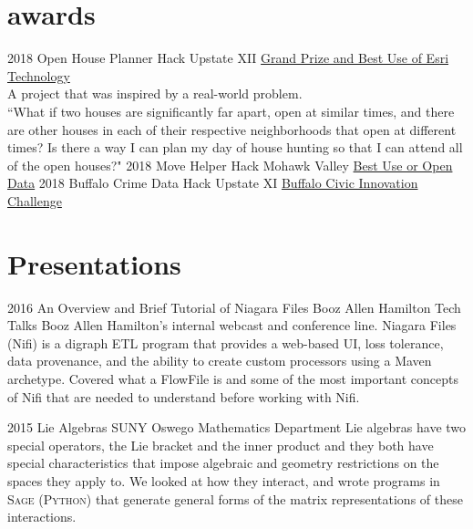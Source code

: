 \documentclass[]{twentysecondcv}
\begin{document}
\section{awards}
  \begin{twenty}
    \twentyitem
    {2018}
    {Open House Planner} %
    {Hack Upstate XII} %
    {\href{https://medium.com/@hackupstate/hack-upstate-xii-the-results-are-in-e5be2f4edcc0}{Grand Prize and Best Use of Esri Technology}\\
    A project that was inspired by a real-world problem.\\
    ``What if two houses are significantly far apart, open at similar times, and there are other houses in each of their respective neighborhoods that open at different times? Is there a way I can plan my day of house hunting so that I can attend all of the open houses?"} %
    \twentyitem
      {2018}
      {Move Helper} %
      {Hack Mohawk Valley} %
      {\href{https://medium.com/@hackupstate/hack-mohawk-valley-the-results-are-in-4dff78924a61\#9a90}{Best Use or Open Data}} %
    \twentyitem
    {2018}
      {Buffalo Crime Data} %
      {Hack Upstate XI} %
      {\href{https://medium.com/@hackupstate/hack-upstate-xi-the-results-are-in-5ee7973f25a\#ffa5}{Buffalo Civic Innovation Challenge}\\
      } %
  \end{twenty}

\newpage
\makeprofile
\section{Presentations}
\begin{twenty}
  \twentyitem
  {2016}
  {An Overview and Brief Tutorial of Niagara Files}
  {Booz Allen Hamilton Tech Talks} %
  {Booz Allen Hamilton's internal webcast and conference line.
  Niagara Files (Nifi) is a digraph ETL program that provides a web-based UI, loss tolerance, data provenance, and the ability to create custom processors using a Maven archetype. Covered what a FlowFile is and some of the most important concepts of Nifi that are needed to understand before working with Nifi.}
  
  \twentyitem
  {2015}
  {Lie Algebras}
  {SUNY Oswego Mathematics Department}
  {
  Lie algebras have two special operators, the Lie bracket and the inner product and they both have special characteristics that impose algebraic and geometry restrictions on the spaces they apply to. We looked at how they interact, and wrote programs in \textsc{Sage (Python)} that generate general forms of the matrix representations of these interactions.}
\end{twenty}
\end{document}
